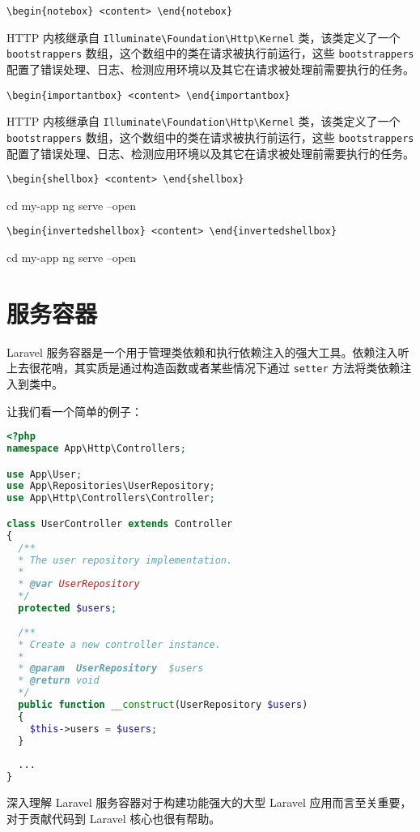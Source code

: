 \documentclass{progartcn}
\begin{document}
\noindent\verb|\begin{notebox} <content> \end{notebox}|

\begin{notebox}
  HTTP 内核继承自 \verb|Illuminate\Foundation\Http\Kernel| 类，该类定义了一个 \verb|bootstrappers| 数组，这个数组中的类在请求被执行前运行，这些 \verb|bootstrappers| 配置了错误处理、日志、检测应用环境以及其它在请求被处理前需要执行的任务。
\end{notebox}

\noindent\verb|\begin{importantbox} <content> \end{importantbox}|

\begin{importantbox}
  HTTP 内核继承自 \verb|Illuminate\Foundation\Http\Kernel| 类，该类定义了一个 \verb|bootstrappers| 数组，这个数组中的类在请求被执行前运行，这些 \verb|bootstrappers| 配置了错误处理、日志、检测应用环境以及其它在请求被处理前需要执行的任务。
\end{importantbox}

\noindent\verb|\begin{shellbox} <content> \end{shellbox}|

\begin{shellbox}
cd my-app
ng serve --open
\end{shellbox}

\noindent\verb|\begin{invertedshellbox} <content> \end{invertedshellbox}|

\begin{invertedshellbox}
cd my-app
ng serve --open
\end{invertedshellbox}


\section{服务容器}

Laravel 服务容器是一个用于管理类依赖和执行依赖注入的强大工具。依赖注入听上去很花哨，其实质是通过构造函数或者某些情况下通过 \verb|setter| 方法将类依赖注入到类中。

让我们看一个简单的例子：

\clearpage

\begin{lstlisting}[language=PHP,caption={PHP 代码样例}]
<?php
namespace App\Http\Controllers;

use App\User;
use App\Repositories\UserRepository;
use App\Http\Controllers\Controller;

class UserController extends Controller
{
  /**
  * The user repository implementation.
  *
  * @var UserRepository
  */
  protected $users;
  
  /**
  * Create a new controller instance.
  * 
  * @param  UserRepository  $users
  * @return void
  */
  public function __construct(UserRepository $users)
  {
    $this->users = $users;
  }
  
  ...
}
\end{lstlisting}

深入理解 Laravel 服务容器对于构建功能强大的大型 Laravel 应用而言至关重要，对于贡献代码到 Laravel 核心也很有帮助。
\end{document}
